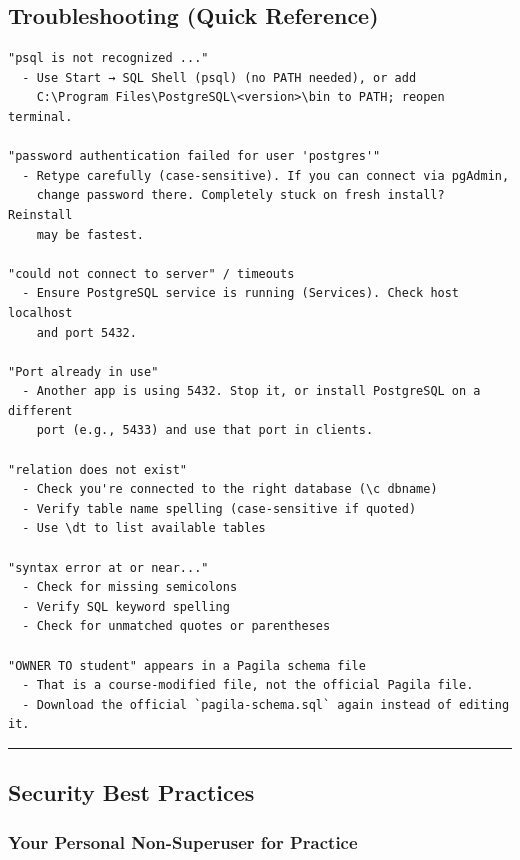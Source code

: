 \documentclass[
  letterpaper,
  DIV=11,
  numbers=noendperiod]{scrartcl}
\begin{document}
\subsection{Troubleshooting (Quick
Reference)}\label{troubleshooting-quick-reference}

\begin{verbatim}
"psql is not recognized ..."
  - Use Start → SQL Shell (psql) (no PATH needed), or add
    C:\Program Files\PostgreSQL\<version>\bin to PATH; reopen terminal.

"password authentication failed for user 'postgres'"
  - Retype carefully (case-sensitive). If you can connect via pgAdmin, 
    change password there. Completely stuck on fresh install? Reinstall 
    may be fastest.

"could not connect to server" / timeouts
  - Ensure PostgreSQL service is running (Services). Check host localhost 
    and port 5432.

"Port already in use"
  - Another app is using 5432. Stop it, or install PostgreSQL on a different 
    port (e.g., 5433) and use that port in clients.

"relation does not exist"
  - Check you're connected to the right database (\c dbname)
  - Verify table name spelling (case-sensitive if quoted)
  - Use \dt to list available tables

"syntax error at or near..."
  - Check for missing semicolons
  - Verify SQL keyword spelling
  - Check for unmatched quotes or parentheses

"OWNER TO student" appears in a Pagila schema file
  - That is a course-modified file, not the official Pagila file.
  - Download the official `pagila-schema.sql` again instead of editing it.
\end{verbatim}

\begin{center}\rule{0.5\linewidth}{0.5pt}\end{center}

\subsection{Security Best Practices}\label{security-best-practices}

\subsubsection{Your Personal Non-Superuser for
Practice}\label{your-personal-non-superuser-for-practice}
\end{document}
